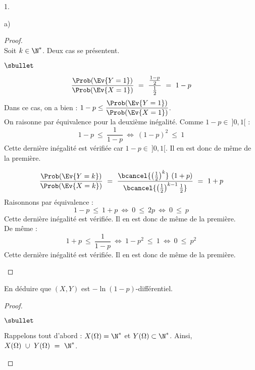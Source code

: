 \documentclass[11pt]{article}%
\begin{document}
\begin{noliste}{1.}
\begin{noliste}{a)}
    \begin{proof}~\\%
      Soit $k \in \N^*$. Deux cas se présentent.
      \begin{noliste}{$\sbullet$}
      \item {} 
        \[
        \dfrac{\Prob(\Ev{Y = 1})}{\Prob(\Ev{X = 1})} \ = \
        \dfrac{\frac{1-p}{2}}{\frac{1}{2}} \ = \ 1-p
        \]
        Dans ce cas, on a bien : $1-p \leq \dfrac{\Prob(\Ev{Y = 
	1})}{\Prob(\Ev{X = 1})}$.\\
        On raisonne par équivalence pour la deuxième inégalité. Comme
        $1 - p \in \ ]0, 1[$ :~\\[-.4cm]
        \[
        1-p \ \leq \ \dfrac{1}{1-p} \ \Leftrightarrow \ (1-p)^2 \ \leq
        \ 1
        \]
        Cette dernière inégalité est vérifiée car $1 - p \in \ ]0,
        1[$. Il en est donc de même de la première. %
        \conc{$1-p \ \leq \ \dfrac{\Prob(\Ev{Y = 1})}{\Prob(\Ev{X =
              1})} \ \leq \ \dfrac{1}{1-p}$}

      \item {}
        \[
        \dfrac{\Prob(\Ev{Y = k})}{\Prob(\Ev{X = k})} \ = \
        \dfrac{\bcancel{\left( \frac{1}{2} \right)^{k}} \ (1 +
          p)}{\bcancel{\left( \frac{1}{2} \right)^{k-1} \frac{1}{2}}}
        \ = \ 1+p
        \]
        Raisonnons par équivalence :
        \[
        1 - p \ \leq \ 1 + p \ \Leftrightarrow \ 0 \ \leq \ 2 p \
        \Leftrightarrow \ 0 \ \leq \ p
        \]
        Cette dernière inégalité est vérifiée. Il en est donc de même
        de la première.\\
        De même :
        \[
        1+p \ \leq \ \dfrac{1}{1-p} \ \Leftrightarrow \ 1-p^2 \ \leq \
        1 \ \Leftrightarrow \ 0 \ \leq \ p^2
        \]
        Cette dernière inégalité est vérifiée. Il en est donc de même
        de la première.%
        ~\\[-1.2cm]
      \end{noliste}
    \end{proof}
    
    
    \newpage
    

  \item En déduire que $(X,Y)$ est $-\ln(1-p)$-différentiel.

    \begin{proof}~%
      \begin{noliste}{$\sbullet$}
      \item Rappelons tout d'abord : $X(\Omega) = \N^*$ et $Y(\Omega)
        \subset \N^*$. Ainsi, $X(\Omega) \ \cup \ Y(\Omega) \ = \ \N^*$.


\end{noliste}
\end{proof}
\end{noliste}
\end{noliste}
\end{document}
